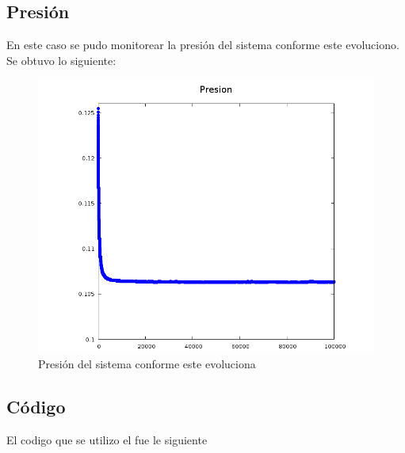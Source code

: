 \documentclass[12pt,letterpaper]{article}
\begin{document}
\subsection*{Presión}
En este caso se pudo monitorear la presión del sistema conforme este evoluciono. Se obtuvo lo siguiente:

\begin{figure}[H]
	\centering
	\includegraphics[width=0.75\linewidth]{Presion.png}
	\caption{Presión del sistema conforme este evoluciona}
	\label{Press}
\end{figure}



\subsection*{Código}
El codigo que se utilizo el fue le siguiente







\end{document}
